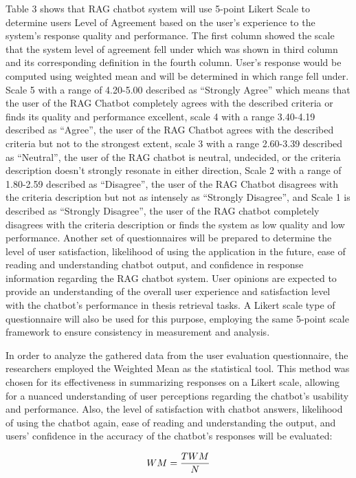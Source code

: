 \begin{refsection}
Table 3 shows that RAG chatbot system will use 5-point Likert Scale to determine users Level of Agreement based on the user’s experience to the system’s response quality and performance. The first column showed the scale that the system level of agreement fell under which was shown in third column and its corresponding definition in the fourth column. User’s response would be computed using weighted mean and will be determined in which range fell under. Scale 5 with a range of 4.20-5.00 described as “Strongly Agree” which means that the user of the RAG Chatbot completely agrees with the described criteria or finds its quality and performance excellent, scale 4 with a range 3.40-4.19 described as “Agree”, the user of the RAG Chatbot agrees with the described criteria but not to the strongest extent, scale 3 with a range 2.60-3.39 described as “Neutral”, the user of the RAG chatbot is neutral, undecided, or the  criteria description doesn’t strongly resonate in either direction, Scale 2 with a range of 1.80-2.59 described as “Disagree”, the user of the RAG Chatbot disagrees with the criteria description but not as intensely as “Strongly Disagree”, and Scale 1 is described as “Strongly Disagree”, the user of the RAG chatbot completely disagrees with the criteria description or finds the system as low quality and low performance. Another set of questionnaires will be prepared to determine the level of user satisfaction, likelihood of using the application in the future, ease of reading and understanding chatbot output, and confidence in response information regarding the RAG chatbot system. User opinions are expected to provide an understanding of the overall user experience and satisfaction level with the chatbot's performance in thesis retrieval tasks. A Likert scale type of questionnaire will also be used for this purpose, employing the same 5-point scale framework to ensure consistency in measurement and analysis.

In order to analyze the gathered data from the user evaluation questionnaire, the researchers employed the Weighted Mean as the statistical tool. This method was chosen for its effectiveness in summarizing responses on a Likert scale, allowing for a nuanced understanding of user perceptions regarding the chatbot's usability and performance. Also, the level of satisfaction with chatbot answers, likelihood of using the chatbot again, ease of reading and understanding the output, and users’ confidence in the accuracy of the chatbot’s responses will be evaluated:

\begin{equation}
    \centering
    WM = \frac{TWM}{N}
\end{equation}


\end{refsection}
